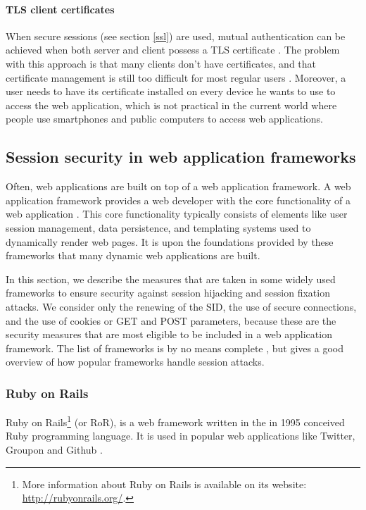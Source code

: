 \paragraph{TLS client certificates}\label{certificates}
When secure sessions (see section \ref{ssl}) are used, mutual authentication can be achieved when both server and client possess a TLS certificate \cite{Park2000}. The problem with this approach is that many clients don't have certificates, and that certificate management is still too difficult for most regular users \cite{Whitten1999}. Moreover, a user needs to have its certificate installed on every device he wants to use to access the web application, which is not practical in the current world where people use smartphones and public computers to access web applications.

\subsection{Session security in web application frameworks}\label{frameworks}

Often, web applications are built on top of a web application framework. A \gls{web application framework} provides a web developer with the core functionality of a web application \cite{Schwartz2010}. This core functionality typically consists of elements like user session management, data persistence, and templating systems used to dynamically render web pages. It is upon the foundations provided by these frameworks that many dynamic web applications are built.

In this section, we describe the measures that are taken in some widely used frameworks to ensure security against session hijacking and session fixation attacks. We consider only the renewing of the SID, the use of secure connections, and the use of cookies or GET and POST parameters, because these are the security measures that are most eligible to be included in a web application framework. The list of frameworks is by no means complete \cite{FrameworksComparison}, but gives a good overview of how popular frameworks handle session attacks.

\subsubsection{Ruby on Rails}

Ruby on Rails\footnote{More information about Ruby on Rails is available on its website: \url{http://rubyonrails.org/}.} (or RoR), is a web framework written in the in 1995 conceived Ruby programming language. It is used in popular web applications like Twitter, Groupon and Github \cite{RailsApps}.

